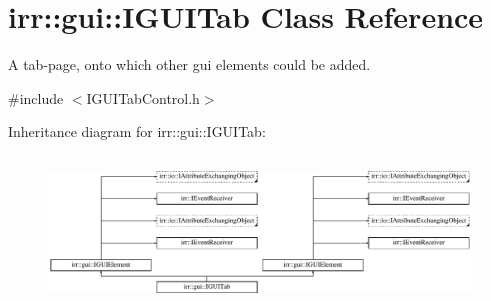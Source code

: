 \hypertarget{classirr_1_1gui_1_1IGUITab}{}\section{irr\+:\+:gui\+:\+:I\+G\+U\+I\+Tab Class Reference}
\label{classirr_1_1gui_1_1IGUITab}


A tab-\/page, onto which other gui elements could be added.  




{\ttfamily \#include $<$I\+G\+U\+I\+Tab\+Control.\+h$>$}

Inheritance diagram for irr\+:\+:gui\+:\+:I\+G\+U\+I\+Tab\+:\begin{figure}[H]
\begin{center}
\leavevmode
\includegraphics[height=4.038462cm]{classirr_1_1gui_1_1IGUITab}
\end{center}
\end{figure}
